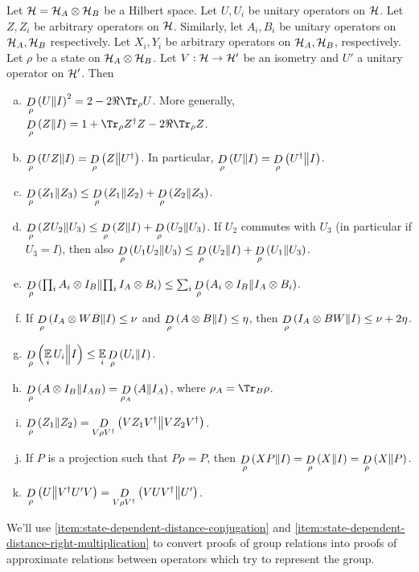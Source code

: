 \begin{lemma}\label{lemma:state-dependent-distance}
	Let $\mathcal H = \mathcal H_A\otimes \mathcal H_B$ be a Hilbert space. Let $U,U_i$ be unitary operators on $\mathcal H$. Let $Z,Z_i$ be arbitrary operators on $\mathcal H$. Similarly, let $A_i, B_i$ be unitary operators on $\mathcal H_A, \mathcal H_B$ respectively. Let $X_i, Y_i$ be arbitrary operators on $\mathcal H_A, \mathcal H_B$, respectively.
	Let $\rho$ be a state on $\mathcal H_A\otimes \mathcal H_B$. Let $V: \mathcal H\to \mathcal H'$ be an isometry and $U'$ a unitary operator on $\mathcal H'$. Then
	\begin{enumerate} [(a)]
		\item 
		\label{item:state-dependent-distance-square} 
		$\drho{\rho}{U}{I}^2 =2 - 2\Re\Tr_\rho U$. More generally, $\drho{\rho} ZI = 1 + \Tr_\rho Z\dagg Z - 2\Re\Tr_\rho Z$.
		\item
		\label{item:state-dependent-distance-inverse} 
		$\mathop{D}\limits_{\rho}\left(UZ\middle\| I\right) = \mathop{D}\limits_{\rho}\left(Z\middle\| U^\dagger\right)$. In particular, $\mathop{D}\limits_{\rho}\left(U\middle\| I\right)=\mathop{D}\limits_{\rho}\left(U^\dagger\middle\| I\right)$.
		\item\label{item:state-dependent-distance-triangle}
		$\mathop{D}\limits_{\rho}\left(Z_1\middle\| Z_3\right) \leq \mathop{D}\limits_{\rho}\left(Z_1\middle\| Z_2\right) + \mathop{D}\limits_{\rho}\left(Z_2\middle\| Z_3\right)$.
		\item\label{item:state-dependent-distance-right-multiplication} $\mathop{D}\limits_{\rho}\left(ZU_2\middle\| U_3\right) \leq \mathop{D}\limits_{\rho}\left(Z\middle\| I\right) + \mathop{D}\limits_{\rho}\left(U_2\middle\| U_3\right)$. If $U_2$ commutes with $U_3$ (in particular if $U_3 = I$), then also $\mathop{D}\limits_{\rho}\left(U_1U_2\middle\| U_3\right) \leq \mathop{D}\limits_{\rho}\left(U_2\middle\| I\right) + \mathop{D}\limits_{\rho}\left(U_1\middle\| U_3\right)$.
		\item\label{item:state-dependent-distance-chaining} $\mathop{D}\limits_{\rho}\left(\prod_{i}{A_i\otimes I_B}\middle\| \prod_{i}I_A \otimes B_i\right) \leq \sum_i \mathop{D}\limits_{\rho}\left(A_i\otimes I_B\middle\|  I_A\otimes B_i\right)$.
		\item\label{item:state-dependent-distance-conjugation} If $\mathop{D}\limits_{\rho}\left(I_A\otimes WB\middle\| I\right) \leq \nu$ and $\mathop{D}\limits_{\rho}\left(A\otimes B\middle\| I\right)\leq \eta$, then \mbox{$\mathop{D}\limits_{\rho}\left(I_A\otimes BW\middle\| I\right)\leq \nu + 2\eta$.}
		\item\label{item:state-dependent-distance-jensen}
		$\mathop{D}\limits_{\rho}\left(\operatorname*{\mathbb E}\limits_{i}{ U_i}\middle\| I\right) \leq \operatorname*{\mathbb E}\limits_{i}\mathop{D}\limits_{\rho}\left(U_i\middle\|  I\right)$.
		\item \label{item:state-dependent-distance-partial-trace}
		$\mathop{D}\limits_{\rho}\left(A\otimes I_B\middle\| I_{AB}\right) = \mathop{D}\limits_{\rho_A}\left(A\middle\| I_A\right)$, where $\rho_A = \Tr_B \rho$.
		\item \label{item:state-dependent-distance-isometry}
		$\mathop{D}\limits_{\rho}\left(Z_1\middle\| Z_2\right) = \mathop{D}\limits_{V\rho V^\dagger}\left(VZ_1V^\dagger\middle\| VZ_2V^\dagger\right)$. 
		\item\label{item:state-dependent-distance-projection-is-identity} 
		If $P$ is a projection such that $P\rho = P$, then $\mathop{D}\limits_{\rho}\left(XP\middle\| I\right) = \mathop{D}\limits_{\rho}\left(X\middle\| I\right) = \mathop{D}\limits_{\rho}\left(X\middle\| P\right)$.
		\item \label{item:state-dependent-distance-isometry-switching} $\mathop{D}\limits_{\rho}\left(U\middle\| V^\dagger U' V\right) = \mathop{D}\limits_{V\rho V^\dagger}\left(VUV^\dagger\middle\| U'\right)$.
	\end{enumerate}
\end{lemma}
We'll use \eqref{item:state-dependent-distance-conjugation} and \eqref{item:state-dependent-distance-right-multiplication} to convert proofs of group relations into proofs of approximate relations between operators which try to represent the group.

